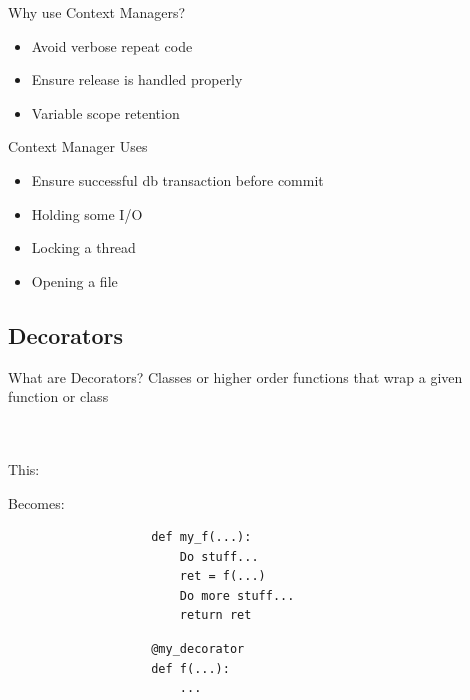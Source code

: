 \documentclass[11pt]{beamer}
\newcommand{\emptyline}{$ $\\}
\begin{document}
		\begin{frame}[fragile]{Why use Context Managers?}
			\begin{itemize}
				\item Avoid verbose repeat code
				\item Ensure release is handled properly
				\item Variable scope retention
			\end{itemize}
		\end{frame}
		
		\begin{frame}[fragile]{Context Manager Uses}
			\begin{itemize}
				\item Ensure successful db transaction before commit
				\item Holding some I/O
				\item Locking a thread
				\item Opening a file
			\end{itemize}
		\end{frame}
	
	\subsection{Decorators}
		\begin{frame}[fragile]{What are Decorators?}
			Classes or higher order functions that wrap a given function or class \\
			\emptyline
			\emptyline
			
			\begin{minipage}{0.45\linewidth}
				This:
			\end{minipage}
			\begin{minipage}{0.45\linewidth}
				Becomes:
			\end{minipage}
			
			\begin{minipage}{0.45\linewidth}
				\begin{lstlisting}
					def my_f(...):  
					    Do stuff...         
					    ret = f(...)        
					    Do more stuff...    
					    return ret
				\end{lstlisting}
			\end{minipage}
			\pause
			\begin{minipage}{0.45\linewidth}
				\begin{lstlisting}
					@my_decorator
					def f(...):
					    ...
				\end{lstlisting}
			\end{minipage}
		\end{frame}
		
\end{document}
